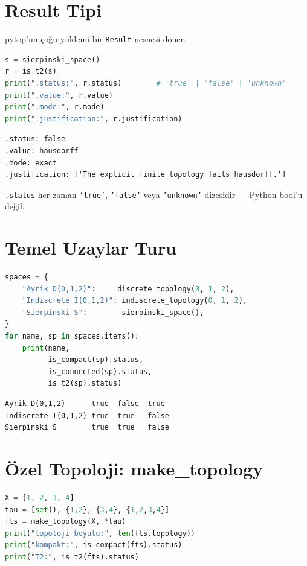 \section{Result Tipi}

pytop'un çoğu yüklemi bir \texttt{Result} nesnesi döner.

\begin{lstlisting}[language=Python]
s = sierpinski_space()
r = is_t2(s)
print(".status:", r.status)        # 'true' | 'false' | 'unknown'
print(".value:", r.value)
print(".mode:", r.mode)
print(".justification:", r.justification)
\end{lstlisting}

\begin{verbatim}
.status: false
.value: hausdorff
.mode: exact
.justification: ['The explicit finite topology fails hausdorff.']
\end{verbatim}

\texttt{.status} her zaman \texttt{'true'}, \texttt{'false'} veya \texttt{'unknown'}
dizesidir --- Python bool'u değil.

\section{Temel Uzaylar Turu}

\begin{lstlisting}[language=Python]
spaces = {
    "Ayrik D(0,1,2)":     discrete_topology(0, 1, 2),
    "Indiscrete I(0,1,2)": indiscrete_topology(0, 1, 2),
    "Sierpinski S":        sierpinski_space(),
}
for name, sp in spaces.items():
    print(name,
          is_compact(sp).status,
          is_connected(sp).status,
          is_t2(sp).status)
\end{lstlisting}

\begin{verbatim}
Ayrik D(0,1,2)      true  false  true
Indiscrete I(0,1,2) true  true   false
Sierpinski S        true  true   false
\end{verbatim}

\section{Özel Topoloji: make\_topology}

\begin{lstlisting}[language=Python]
X = [1, 2, 3, 4]
tau = [set(), {1,2}, {3,4}, {1,2,3,4}]
fts = make_topology(X, *tau)
print("topoloji boyutu:", len(fts.topology))
print("kompakt:", is_compact(fts).status)
print("T2:", is_t2(fts).status)
\end{lstlisting}

